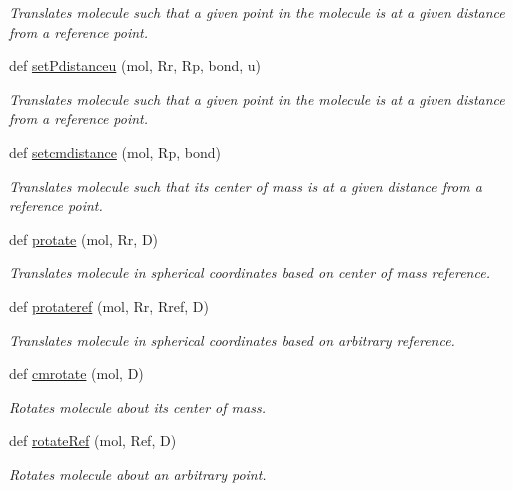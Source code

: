 \begin{DoxyCompactItemize}
\begin{DoxyCompactList}\small\item\em Translates molecule such that a given point in the molecule is at a given distance from a reference point. \end{DoxyCompactList}\item 
def \hyperlink{namespacemolSimplify_1_1Scripts_1_1geometry_a67598d5fb5cb3e55b1829298b62d9f46}{set\+Pdistanceu} (mol, Rr, Rp, bond, u)
\begin{DoxyCompactList}\small\item\em Translates molecule such that a given point in the molecule is at a given distance from a reference point. \end{DoxyCompactList}\item 
def \hyperlink{namespacemolSimplify_1_1Scripts_1_1geometry_a3ea4c34e0e07a3a92d31bd6b673a1fce}{setcmdistance} (mol, Rp, bond)
\begin{DoxyCompactList}\small\item\em Translates molecule such that its center of mass is at a given distance from a reference point. \end{DoxyCompactList}\item 
def \hyperlink{namespacemolSimplify_1_1Scripts_1_1geometry_ab942da4b95418e12716685e3abee16e5}{protate} (mol, Rr, D)
\begin{DoxyCompactList}\small\item\em Translates molecule in spherical coordinates based on center of mass reference. \end{DoxyCompactList}\item 
def \hyperlink{namespacemolSimplify_1_1Scripts_1_1geometry_a5f9b944e195ebf9c9997e1abc7d4fd74}{protateref} (mol, Rr, Rref, D)
\begin{DoxyCompactList}\small\item\em Translates molecule in spherical coordinates based on arbitrary reference. \end{DoxyCompactList}\item 
def \hyperlink{namespacemolSimplify_1_1Scripts_1_1geometry_a891c57b819e0c6b2a00e9a495fc0dac9}{cmrotate} (mol, D)
\begin{DoxyCompactList}\small\item\em Rotates molecule about its center of mass. \end{DoxyCompactList}\item 
def \hyperlink{namespacemolSimplify_1_1Scripts_1_1geometry_ac0753e6f8d4fa1b2193cdbf99e3d1c8b}{rotate\+Ref} (mol, Ref, D)
\begin{DoxyCompactList}\small\item\em Rotates molecule about an arbitrary point. \end{DoxyCompactList}\item 

\end{DoxyCompactItemize}
